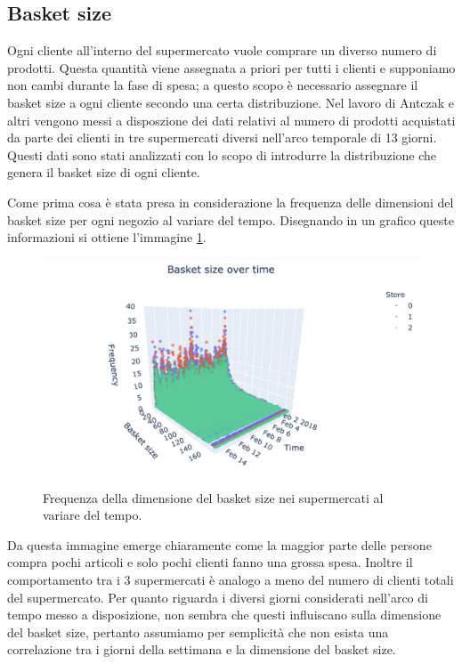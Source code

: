 \subsection{Basket size}
Ogni cliente all'interno del supermercato vuole comprare un diverso numero di prodotti. Questa quantità viene assegnata a priori per tutti i clienti e supponiamo non cambi durante la fase di spesa; a questo scopo è necessario assegnare il basket size a ogni cliente secondo una certa distribuzione. Nel lavoro di Antczak e altri \cite{article1} vengono messi a disposzione dei dati relativi al numero di prodotti acquistati da parte dei clienti in tre supermercati diversi nell'arco temporale di 13 giorni. Questi dati sono stati analizzati con lo scopo di introdurre la distribuzione che genera il basket size di ogni cliente.

Come prima cosa è stata presa in considerazione la frequenza delle dimensioni del basket size per ogni negozio al variare del tempo. Disegnando in un grafico queste informazioni si ottiene l'immagine \ref{fig:3d_basket_size}.

\begin{figure}[H]
	\centering
	\includegraphics[width=14cm]{"images/3d_basket_size.png"}
	\caption{Frequenza della dimensione del basket size nei supermercati al variare del tempo.}
	\label{fig:3d_basket_size}
\end{figure}

Da questa immagine emerge chiaramente come la maggior parte delle persone compra pochi articoli e solo pochi clienti fanno una grossa spesa. Inoltre il comportamento tra i 3 supermercati è analogo a meno del numero di clienti totali del supermercato. Per quanto riguarda i diversi giorni considerati nell'arco di tempo messo a disposizione, non sembra che questi influiscano sulla dimensione del basket size, pertanto assumiamo per semplicità che non esista una correlazione tra i giorni della settimana e la dimensione del basket size.

